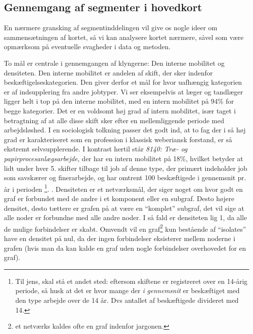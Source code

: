 \subsection{Gennemgang af segmenter i hovedkort}

En nærmere gransking af segmentinddelingen vil give os nogle ideer om sammensætningen af kortet, så vi kan analysere kortet nærmere, såvel som være opmærksom på eventuelle svagheder i data og metoden.

To mål er centrale i gennemgangen af klyngerne: Den interne mobilitet og densiteten. Den interne mobilitet er andelen af skift, der sker indenfor beskæftigelseskategorien. Den giver derfor et mål for hvor uafhængig kategorien er af indsupplering fra andre jobtyper. Vi ser eksempelvis at læger og tandlæger ligger helt i top på den interne mobilitet, med en intern mobilitet på 94\% for begge kategorier. Det er en voldsomt høj grad af intern mobilitet, især taget i betragtning af at alle disse skift sker efter en mellemliggende periode med arbejdsløshed. I en sociologisk tolkning passer det godt ind, at to fag der i så høj grad er karakteriseret som en profession i klassisk weberiansk forstand, er så ekstremt selvsupplerende. I kontrast hertil står \textit{8140: Træ- og papirprocesanlægsarbejde}, der har en intern mobilitet på 18\%, hvilket betyder at lidt under hver 5. skifter tilbage til job af denne type, der primært indeholder job som savskærer og finerarbejde, og har omtrent 100 beskæftigede i gennemsnit pr. år i perioden%
%
\footnote{Til jens, skal stå et andet sted: eftersom skiftene er registreret over en 14-årig periode, så husk at det er hvor mange der \emph{i gennemsnit} er beskæftiget med den type arbejde over de 14 år. Dvs antallet af beskæftigede divideret med 14.}.
%
.
Densiteten er et netværksmål, der siger noget om hvor godt en graf er forbundet med de andre i et komponent eller en subgraf. Desto højere densitet, desto tættere er grafen på at være en “komplet” subgraf, det vil sige at alle noder er forbundne med alle andre noder. I så fald er densiteten lig 1, da alle de mulige forbindelser er skabt. Omvendt vil en graf\footnote{et netværks kaldes ofte en graf indenfor jargonen.} kun bestående af “isolates” have en densitet på nul, da der ingen forbindelser eksisterer mellem noderne i grafen (hvis man da kan kalde en graf uden nogle forbindelser overhovedet for en graf).

